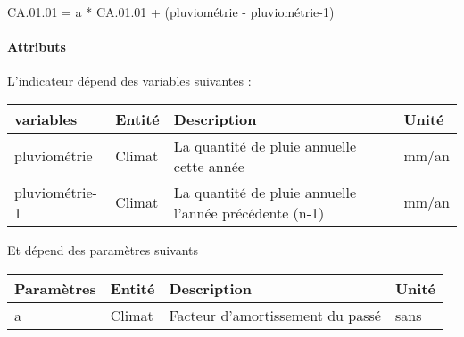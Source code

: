 \documentclass[
]{article}
\newenvironment{Shaded}{\begin{snugshade}}{\end{snugshade}}
\newcommand{\NormalTok}[1]{#1}
\begin{document}
\begin{Shaded}
\begin{Highlighting}[]
\NormalTok{CA.01.01 = a * CA.01.01 + (pluviométrie {-} pluviométrie{-}1)}
\end{Highlighting}
\end{Shaded}

\paragraph{Attributs}\label{attributs-35}

L'indicateur dépend des variables suivantes :

\begin{longtable}[]{@{}
  >{\raggedright\arraybackslash}p{}
  >{\raggedright\arraybackslash}p{}
  >{\raggedright\arraybackslash}p{}
  >{\raggedright\arraybackslash}p{}@{}}
\toprule\noalign{}
\begin{minipage}[b]{\linewidth}\raggedright
\textbf{variables}
\end{minipage} & \begin{minipage}[b]{\linewidth}\raggedright
\textbf{Entité}
\end{minipage} & \begin{minipage}[b]{\linewidth}\raggedright
\textbf{Description}
\end{minipage} & \begin{minipage}[b]{\linewidth}\raggedright
\textbf{Unité}
\end{minipage} \\
\midrule\noalign{}
\endhead
\bottomrule\noalign{}
\endlastfoot
pluviométrie & Climat & La quantité de pluie annuelle cette année &
mm/an \\
pluviométrie-1 & Climat & La quantité de pluie annuelle l'année
précédente (n-1) & mm/an \\
\end{longtable}

Et dépend des paramètres suivants

\begin{longtable}[]{@{}llll@{}}
\toprule\noalign{}
\textbf{Paramètres} & \textbf{Entité} & \textbf{Description} &
\textbf{Unité} \\
\midrule\noalign{}
\endhead
\bottomrule\noalign{}
\endlastfoot
a & Climat & Facteur d'amortissement du passé & sans \\
\end{longtable}
\end{document}
